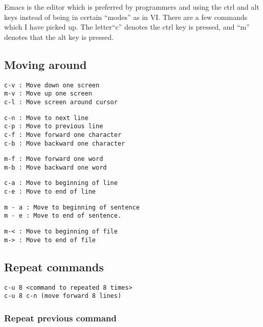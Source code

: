 \documentclass[a4paper, 10pt]{article}
\begin{document}
Emacs is the editor which is preferred by programmers and using the ctrl and alt keys instead of being in certain ``modes'' as in VI. There are a few commands which I have picked up. The letter``c'' denotes the ctrl key is pressed, and ``m'' denotes that the alt key is pressed.

\subsection*{Moving around}
\begin{verbatim}
c-v : Move down one screen
m-v : Move up one screen
c-l : Move screen around cursor
 \end{verbatim}
 
 \begin{verbatim}
c-n : Move to next line
c-p : Move to previous line
c-f : Move forward one character
c-b : Move backward one character
 \end{verbatim}
 
 \begin{verbatim}
m-f : Move forward one word
m-b : Move backward one word
 \end{verbatim}
 
  \begin{verbatim}
c-a : Move to beginning of line
c-e : Move to end of line
 \end{verbatim}
 
  \begin{verbatim}
m - a : Move to beginning of sentence
m - e : Move to end of sentence.
 \end{verbatim}
 
  \begin{verbatim}
m-< : Move to beginning of file
m-> : Move to end of file
 \end{verbatim}
 
 \subsection*{Repeat commands}
 
  \begin{verbatim}
c-u 8 <command to repeated 8 times>
c-u 8 c-n (move forward 8 lines)
 \end{verbatim}

\subsubsection*{Repeat previous command}
\label{sec:repe-prev-comm}
\end{document}
